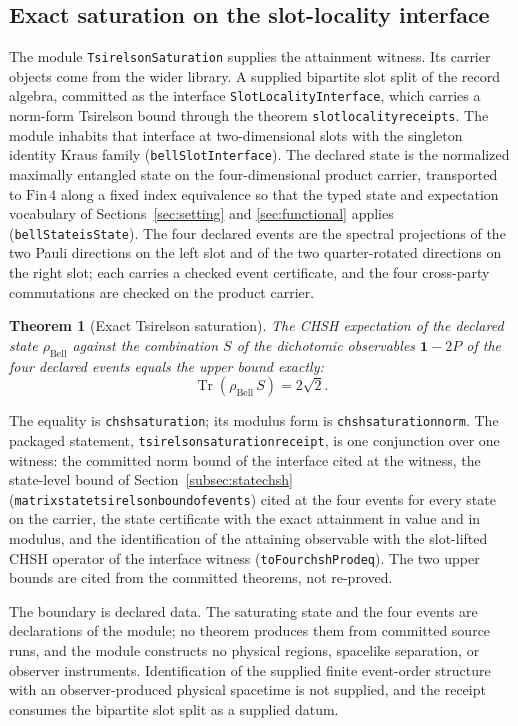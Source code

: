 \documentclass[11pt]{article}
\renewcommand{\_}{\textunderscore\allowbreak}
\newtheorem{theorem}{Theorem}
\theoremstyle{remark}
\newcommand{\Tr}{\operatorname{Tr}}
\newcommand{\one}{\mathbf 1}
\begin{document}
\subsection{Exact saturation on the slot-locality interface}
\label{subsec:saturation}

The module \texttt{TsirelsonSaturation} supplies the attainment
witness. Its carrier objects come from the wider library. A supplied
bipartite slot split of the record algebra, committed as the interface
\texttt{SlotLocalityInterface}, which carries a norm-form Tsirelson bound
through the theorem \texttt{slot\_locality\_receipts}. The module inhabits
that interface at two-dimensional slots with the singleton identity Kraus
family (\texttt{bellSlotInterface}). The declared state is the normalized
maximally entangled state on the four-dimensional product carrier,
transported to $\mathrm{Fin}\,4$ along a fixed index equivalence so that
the typed state and expectation vocabulary of
Sections~\ref{sec:setting} and \ref{sec:functional} applies
(\texttt{bellState\_isState}). The four declared events are the spectral
projections of the two Pauli directions on the left slot and of the two
quarter-rotated directions on the right slot; each carries a checked event
certificate, and the four cross-party commutations are checked on the
product carrier.

\begin{theorem}[Exact Tsirelson saturation]
\label{thm:saturation}
The CHSH expectation of the declared state $\rho_{\mathrm{Bell}}$ against
the combination $S$ of the dichotomic observables $\one-2P$ of the four
declared events equals the upper bound exactly:
\[
 \Tr(\rho_{\mathrm{Bell}}\,S)=2\sqrt2 .
\]
\end{theorem}

The equality is \texttt{chsh\_saturation}; its modulus form is
\texttt{chsh\_saturation\_norm}. The packaged statement,
\texttt{tsirelson\_saturation\_receipt}, is one conjunction over one
witness: the committed norm bound of the interface cited at the witness,
the state-level bound of Section~\ref{subsec:statechsh}
(\texttt{matrix\_state\_tsirelson\_bound\_of\_events}) cited at the four
events for every state on the carrier, the state certificate with the
exact attainment in value and in modulus, and the identification of the
attaining observable with the slot-lifted CHSH operator of the interface
witness (\texttt{toFour\_chshProd\_eq}). The two upper bounds are cited
from the committed theorems, not re-proved.

The boundary is declared data. The saturating state and the four events
are declarations of the module; no theorem produces them from committed
source runs, and the module constructs no physical regions, spacelike
separation, or observer instruments. Identification of the supplied finite event-order structure with an
observer-produced physical spacetime is not supplied, and the receipt consumes the
bipartite slot split as a supplied datum.
\end{document}
